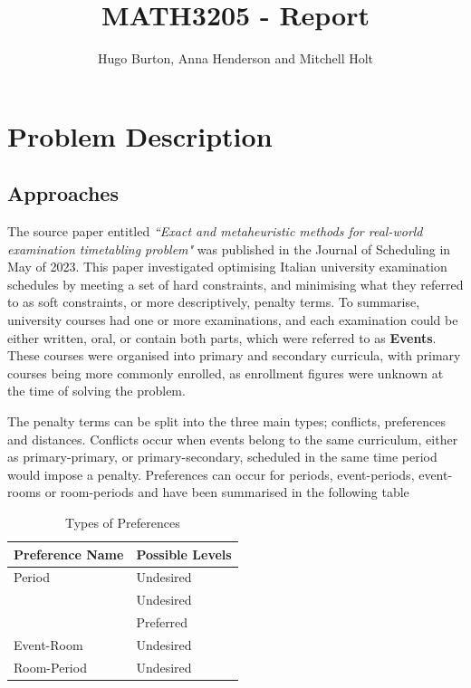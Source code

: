 \documentclass{article}
\title{MATH3205 - Report}
\author{Hugo Burton, Anna Henderson and Mitchell Holt}
\begin{document}
\maketitle

\thispagestyle{fancy}

\tableofcontents


\newpage

\section{Problem Description}
\subsection{Approaches}
The source paper entitled \textit{``Exact and metaheuristic methods for real-world examination timetabling problem"} was published in the Journal of Scheduling in May of 2023. This paper investigated optimising Italian university examination schedules by meeting a set of hard constraints, and minimising what they referred to as soft constraints, or more descriptively, penalty terms. To summarise, university courses had one or more examinations, and each examination could be either written, oral, or contain both parts, which were referred to as \textbf{Events}. These courses were organised into primary and secondary curricula, with primary courses being more commonly enrolled, as enrollment figures were unknown at the time of solving the problem. \medbreak

The penalty terms can be split into the three main types; conflicts, preferences and distances. Conflicts occur when events belong to the same curriculum, either as primary-primary, or primary-secondary, scheduled in the same time period would impose a penalty. Preferences can occur for periods, event-periods, event-rooms or room-periods and have been summarised in the following table

\begin{table}[htb]
    \centering
    \begin{tabular}{|l|l|}
        \hline
        \textbf{Preference Name} & \textbf{Possible Levels} \\
        \hline
        Period & Undesired \\ \hdashline
        \multirow{2}{*}{Event-Period} & Undesired \\
                                     & Preferred \\ \hdashline
        Event-Room & Undesired \\ \hdashline
        Room-Period & Undesired \\
        \hline
    \end{tabular}
    \caption{Types of Preferences}
    \label{tab:preferences_types}
\end{table}
\end{document}

